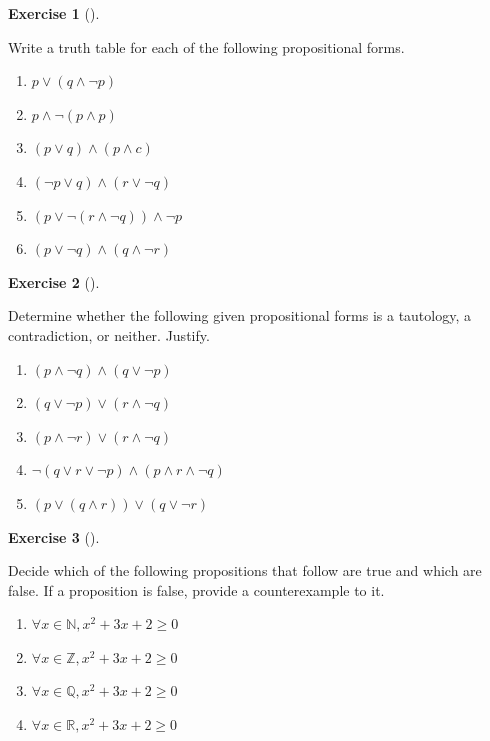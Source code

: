 \documentclass[
  letterpaper,
  10pt,
  reqno,
  twopage,
  openany]{book}
\providecommand{\tightlist}{%
  \setlength{\itemsep}{0pt}\setlength{\parskip}{0pt}}\usepackage{longtable,booktabs,array}
\theoremstyle{plain}
\theoremstyle{definition}
\newtheorem{exercise}{Exercise}[chapter]
\theoremstyle{definition}
\theoremstyle{definition}
\theoremstyle{plain}
\theoremstyle{plain}
\theoremstyle{remark}
\begin{document}
\leavevmode{}%
\begin{exercise}[]\label{exr-truth-table}

Write a truth table for each of the following propositional forms.

\begin{enumerate}
\def\labelenumi{\arabic{enumi}.}
\tightlist
\item
  \(p\lor (q \land \neg p)\)
\item
  \(p\land \neg(p\land p)\)
\item
  \((p\lor q)\land (p\land c)\)
\item
  \((\neg p\lor q)\land (r\lor \neg q)\)
\item
  \((p\lor \neg (r\land \neg q))\land \neg p\)
\item
  \((p \lor \neg q)\land (q\land \neg r)\)
\end{enumerate}

\end{exercise}

\leavevmode{}%
\begin{exercise}[]\label{exr-propositional-forms}

Determine whether the following given propositional forms is a
tautology, a contradiction, or neither. Justify.

\begin{enumerate}
\def\labelenumi{\arabic{enumi}.}
\tightlist
\item
  \((p\land \neg q)\land (q\lor \neg p)\)
\item
  \((q\lor \neg p)\lor(r\land \neg q)\)
\item
  \((p\land \neg r)\lor (r\land \neg q)\)
\item
  \(\neg(q\lor r\lor \neg p)\land (p\land r\land \neg q)\)
\item
  \((p\lor (q\land r))\lor (q\lor \neg r)\)
\end{enumerate}

\end{exercise}

\leavevmode{}%
\begin{exercise}[]\label{exr-true-false-counterexample}

Decide which of the following propositions that follow are true and
which are false. If a proposition is false, provide a counterexample to
it.

\begin{enumerate}
\def\labelenumi{\arabic{enumi}.}
\tightlist
\item
  \(\forall x \in \mathbb{N}, x^2+3x+2\geq 0\)
\item
  \(\forall x \in \mathbb{Z}, x^2+3x+2\geq 0\)
\item
  \(\forall x \in \mathbb{Q}, x^2+3x+2\geq 0\)
\item
  \(\forall x \in \mathbb{R}, x^2+3x+2\geq 0\)
\end{enumerate}

\end{exercise}
\end{document}
